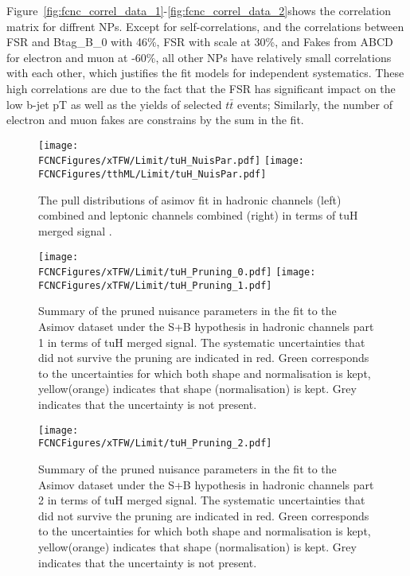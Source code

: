 Figure~\ref{fig:fcnc_correl_data_1}-\ref{fig:fcnc_correl_data_2}shows the correlation matrix for diffrent NPs. Except for self-correlations, and the correlations between FSR and Btag\_B\_0 with 46\%,
FSR with scale at 30\%, and Fakes from ABCD for electron and muon at -60\%, all other NPs have relatively small correlations with each other, which justifies the fit models for independent systematics. These high correlations are due to the fact that the FSR has significant impact on the low b-jet pT as well as the yields of selected
$t\bar t$ events; Similarly, the number of electron and muon fakes are constrains by the sum in the fit.   




\begin{figure}[htb]
\centering
\texttt{[image: \\FCNCFigures/xTFW/Limit/tuH\_NuisPar.pdf]}
\texttt{[image: \\FCNCFigures/tthML/Limit/tuH\_NuisPar.pdf]}
\caption{ The pull distributions of asimov fit in hadronic channels (left) combined and leptonic channels combined (right) in terms of tuH merged signal . }
\label{fig:fcnc_pull_data}
\end{figure}


\begin{figure}[htb]
\centering
\texttt{[image: \\FCNCFigures/xTFW/Limit/tuH\_Pruning\_0.pdf]}
\texttt{[image: \\FCNCFigures/xTFW/Limit/tuH\_Pruning\_1.pdf]}
\caption{ Summary of the pruned nuisance parameters in the fit to the  Asimov dataset under the S+B hypothesis in hadronic channels part 1 in terms of tuH merged signal. The systematic uncertainties that did not survive the pruning are indicated in red. Green corresponds to the uncertainties for which both shape and normalisation is kept, yellow(orange) indicates that shape (normalisation) is kept. Grey indicates that the uncertainty is not present.}
\label{fig:xTFW_pruning_0}
\end{figure}

\begin{figure}[htb]
\centering
\texttt{[image: \\FCNCFigures/xTFW/Limit/tuH\_Pruning\_2.pdf]}
\caption{ Summary of the pruned nuisance parameters in the fit to the Asimov dataset under the S+B hypothesis in hadronic channels part 2 in terms of tuH merged signal. The systematic uncertainties that did not survive the pruning are indicated in red. Green corresponds to the uncertainties for which both shape and normalisation is kept, yellow(orange) indicates that shape (normalisation) is kept. Grey indicates that the uncertainty is not present.}
\label{fig:xTFW_pruning_1}
\end{figure}



